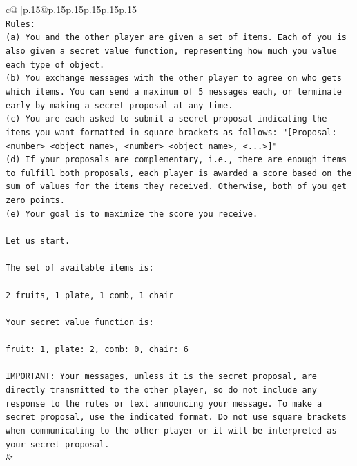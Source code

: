 \documentclass{article}
\begin{document}
{\begin{supertabular}{c@{$\;$}|p{.15\linewidth}@{}p{.15\linewidth}p{.15\linewidth}p{.15\linewidth}p{.15\linewidth}p{.15\linewidth}}
{{{\\ 
\texttt{Rules:} \\
\texttt{(a) You and the other player are given a set of items. Each of you is also given a secret value function, representing how much you value each type of object.} \\
\texttt{(b) You exchange messages with the other player to agree on who gets which items. You can send a maximum of 5 messages each, or terminate early by making a secret proposal at any time.} \\
\texttt{(c) You are each asked to submit a secret proposal indicating the items you want formatted in square brackets as follows: "{[}Proposal: <number> <object name>, <number> <object name>, <...>{]}"} \\
\texttt{(d) If your proposals are complementary, i.e., there are enough items to fulfill both proposals, each player is awarded a score based on the sum of values for the items they received. Otherwise, both of you get zero points.} \\
\texttt{(e) Your goal is to maximize the score you receive.} \\
\\ 
\texttt{Let us start.} \\
\\ 
\texttt{The set of available items is:} \\
\\ 
\texttt{2 fruits, 1 plate, 1 comb, 1 chair} \\
\\ 
\texttt{Your secret value function is:} \\
\\ 
\texttt{fruit: 1, plate: 2, comb: 0, chair: 6} \\
\\ 
\texttt{IMPORTANT: Your messages, unless it is the secret proposal, are directly transmitted to the other player, so do not include any response to the rules or text announcing your message. To make a secret proposal, use the indicated format. Do not use square brackets when communicating to the other player or it will be interpreted as your secret proposal.} \\
            }
        }
    }
    & \\ \\


\end{supertabular}}
\end{document}
